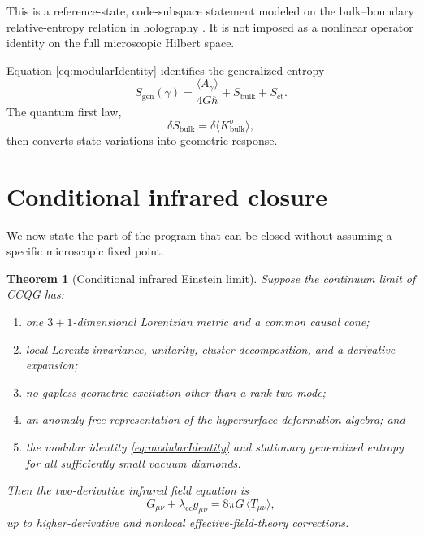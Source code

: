 \documentclass[11pt]{article}
\newtheorem{theorem}[definition]{Theorem}
\theoremstyle{remark}
\begin{document}
This is a reference-state, code-subspace statement modeled on the
bulk--boundary relative-entropy relation in holography
\cite{JLMS2016}.  It is not imposed as a nonlinear operator identity on
the full microscopic Hilbert space.

Equation \eqref{eq:modularIdentity} identifies the generalized entropy
\begin{equation}
  S_{\mathrm{gen}}(\gamma)
  =
  \frac{\langle A_\gamma\rangle}{4G\hbar}
  +S_{\mathrm{bulk}}+S_{\mathrm{ct}}.
  \label{eq:Sgen}
\end{equation}
The quantum first law,
\begin{equation}
  \delta S_{\mathrm{bulk}}
  =\delta\langle K^\sigma_{\mathrm{bulk}}\rangle,
  \label{eq:firstLaw}
\end{equation}
then converts state variations into geometric response.

\section{Conditional infrared closure}

We now state the part of the program that can be closed without assuming a
specific microscopic fixed point.

\begin{theorem}[Conditional infrared Einstein limit]
Suppose the continuum limit of CCQG has:
\begin{enumerate}[label=(\roman*)]
  \item one \(3+1\)-dimensional Lorentzian metric and a common causal cone;
  \item local Lorentz invariance, unitarity, cluster decomposition, and a
        derivative expansion;
  \item no gapless geometric excitation other than a rank-two mode;
  \item an anomaly-free representation of the hypersurface-deformation
        algebra; and
  \item the modular identity \eqref{eq:modularIdentity} and stationary
        generalized entropy for all sufficiently small vacuum diamonds.
\end{enumerate}
Then the two-derivative infrared field equation is
\begin{equation}
  G_{\mu\nu}+\lambda_{\mathrm{cc}}g_{\mu\nu}
  =
  8\pi G\,\langle T_{\mu\nu}\rangle,
  \label{eq:semiclassicalEinstein}
\end{equation}
up to higher-derivative and nonlocal effective-field-theory corrections.
\end{theorem}
\end{document}
